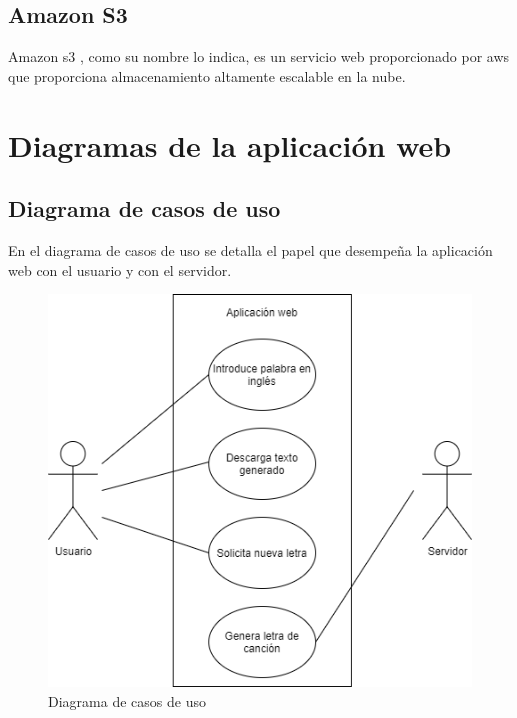 \documentclass[12pt, a4paper, titlepage]{article}
\begin{document}
	\subsection{Amazon S3}
	Amazon \acrfull{s3} \cite{amazon_s3}, como su nombre lo indica, es un servicio web proporcionado por \acrfull{aws} que proporciona almacenamiento altamente escalable en la nube.
	\newpage
	\section{Diagramas de la aplicación web}
	\subsection{Diagrama de casos de uso}
	En el diagrama de casos de uso se detalla el papel que desempeña la aplicación web con el usuario y con el servidor.	
	\begin{figure}[H] 
		\includegraphics[width=13.5cm]{./Imagenes/Diagramas/CasoUso.png}
		\centering \caption{Diagrama de casos de uso}
	\end{figure}
	\newpage
\end{document}
